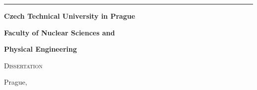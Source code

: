 {\begin{titlepage}
\begin{minipage}[b][\textheight]{0.15\textwidth}
    \end{minipage}
    \hspace{0.05\textwidth}
    \doccol \rule{2pt}{\textheight}
    \hspace{0.05\textwidth}
    \begin{minipage}[b][\textheight]{0.7\textwidth}
      \begin{minipage}[b]{\textwidth}
        \centering \doccol \Large
        \textbf{Czech Technical University in Prague} \par
        \textbf{Faculty of Nuclear Sciences and} \par
        \textbf{Physical Engineering}
      \end{minipage} \par
      \vfill
      \begin{minipage}[b]{\textwidth}
        \centering \doccol \huge \textsc{Dissertation}
      \end{minipage} \par
      \vspace{1cm}
      \begin{minipage}[b]{\textwidth}
        \centering  \doccol \huge \textbf{\@title}
      \end{minipage} \par
      \vfill
      \begin{minipage}[b]{0.95\textwidth}
        Prague, \@Year
        \hfill
        \@Author
      \end{minipage}
    \end{minipage}
  \end{titlepage}
  \cleardoublepage

}
